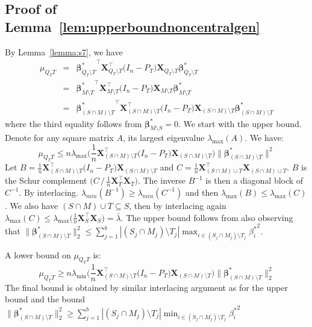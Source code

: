 \documentclass[aos]{imsart}
\theoremstyle{plain}
\newcommand{\bs}{\boldsymbol}
\begin{document}
\subsection{Proof of Lemma~\ref{lem:upperboundnoncentralgen}}
By Lemma~\ref{lemma:s7}, we have
\begin{eqnarray*}
    \mu_{Q_TT}&=&{\bs \beta^*_{Q_T\setminus T}}^{\top}\bs X_{Q_T\setminus T}^{\top}  \big(I_n-P_T\big) \bs X_{Q_T\setminus T} \bs \beta^*_{Q_T\setminus T}\\
    &=&{\bs \beta^*_{M\setminus T}}^{\top}\bs X_{M\setminus T}^{\top}  \big(I_n-P_T\big) \bs X_{M\setminus T} \bs \beta^*_{M\setminus T}\\
    &=&{\bs \beta^*_{(S\cap M)\setminus T}}^{\top}\bs X_{(S\cap M)\setminus T}^{\top}  \big(I_n-P_T\big) \bs X_{(S\cap M)\setminus T} \bs \beta^*_{(S\cap M)\setminus T}
\end{eqnarray*}
where the third equality follows from $\bs \beta^*_{M\setminus S}=0$.
We start with the upper bound. Denote for any square matrix $A$, its largest eigenvalue 
$\lambda_{\max}(A)$. We have:
$$\mu_{Q_TT}\leq n\lambda_{\max}\Big(\frac{1}{n}\bs X_{(S\cap M)\setminus T}^{\top}  \big(I_n-P_T\big) \bs X_{(S\cap M)\setminus T}\Big) \|\bs \beta^*_{(S\cap M)\setminus T}\|^2$$
Let $B=\tfrac{1}{n}\bs X_{(S\cap M)\setminus T}^{\top}  \big(I_n-P_T\big) \bs X_{(S\cap M)\setminus T}$ and $C=\tfrac{1}{n}\bs X_{(S\cap M)\cup T}^{\top}\bs X_{(S\cap M)\cup T}$. $B$ is the Schur complement $\big(C \,  / \, \tfrac{1}{n}\bs X_T^{\top} \bs X_T\big)$. The inverse $B^{-1}$ is then a diagonal block of $C^{-1}$. By interlacing. $\lambda_{min}(B^{-1})\geq \lambda_{min}(C^{-1})$ and then $\lambda_{\max}(B)\leq \lambda_{\max}(C)$. We also have $(S\cap M)\cup T \subseteq S$, then by interlacing again $\lambda_{\max}(C)\leq \lambda_{\max}\Big(\tfrac{1}{n}\bs X_S^{\top}\bs X_S\Big)=\bar{\lambda}$. The upper bound follows from also observing that $\|\bs \beta^*_{(S\cap M)\setminus T}\|_2^2\leq \sum_{j=1}^b |(S_j\cap M_j)\setminus T_j|\max_{i\in (S_j\cap M_j)\setminus T_j}{\beta_i^*}^2$.

A lower bound on $\mu_{Q_TT}$ is: 
$$\mu_{Q_TT}\geq n\lambda_{\min}\Big(\frac{1}{n}\bs X_{(S\cap M)\setminus T}^{\top}  \big(I_n-P_T\big) \bs X_{(S\cap M)\setminus T}\Big) \|\bs \beta^*_{(S\cap M)\setminus T}\|_2^2$$
The final bound is obtained by similar interlacing argument as for the upper bound and the bound $\|\bs \beta^*_{(S\cap M)\setminus T}\|_2^2\geq \sum_{j=1}^b |(S_j\cap M_j)\setminus T_j|\min_{i\in (S_j\cap M_j)\setminus T_j}{\beta_i^*}^2$
\end{document}
